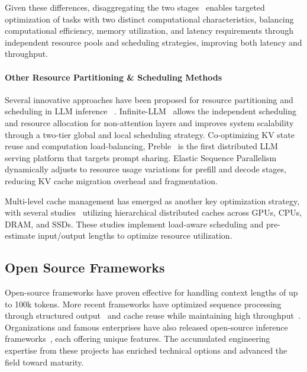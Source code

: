 Given these differences, disaggregating the two stages~\citep{patel2024splitwise, zhong2024distserve, qin2024mooncake, hu2024inference, jin2024p} enables targeted optimization of tasks with two distinct computational characteristics, balancing computational efficiency, memory utilization, and latency requirements through independent resource pools and scheduling strategies, improving both latency and throughput.

\paragraph{Other Resource Partitioning \& Scheduling Methods}

Several innovative approaches have been proposed for resource partitioning and scheduling in LLM inference~\citep{lin2024parrot, hu2024memserve, lin2024infinite, srivatsa2024preble, wu2024loongserve}
. Infinite-LLM~\citep{lin2024infinite} allows the independent scheduling and resource allocation for non-attention layers and improves system scalability through a two-tier global and local scheduling strategy. Co-optimizing KV state reuse and computation load-balancing, Preble~\citep{srivatsa2024preble} is the first distributed LLM serving platform that targets prompt sharing. Elastic Sequence Parallelism~\citep{wu2024loongserve} dynamically adjusts to resource usage variations for prefill and decode stages, reducing KV cache migration overhead and fragmentation.

Multi-level cache management has emerged as another key optimization strategy, with several studies~\citep{jiang2024neo, qin2024mooncake, song2024powerinfer, Deepseek2024DeepSeek-V3} utilizing hierarchical distributed caches across GPUs, CPUs, DRAM, and SSDs. These studies implement load-aware scheduling and pre-estimate input/output lengths to optimize resource utilization.


\subsection*{Open Source Frameworks}

Open-source frameworks have proven effective for handling context lengths of up to 100k tokens. More recent frameworks have optimized sequence processing through structured output~\citep{zheng2024sglang} and cache reuse while maintaining high throughput~\citep{kwon2023efficient, zheng2024sglang}. Organizations and famous enterprises have also released open-source inference frameworks~\citep{qin2024mooncake, NVIDIA2024tensorrt-llm, zhihu2024ZhiLight, 2023lmdeploy, huggingface2024huggingfaceTGI}, each offering unique features. The accumulated engineering expertise from these projects has enriched technical options and advanced the field toward maturity.

